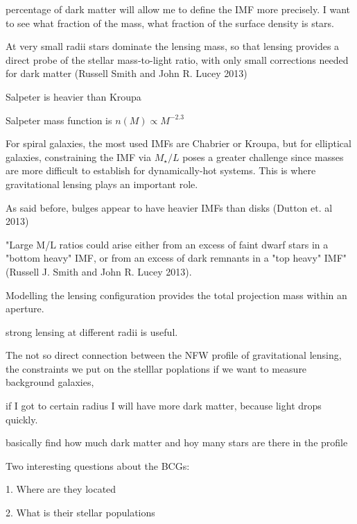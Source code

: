 percentage of dark matter will allow me to define the IMF more precisely. I want to see what fraction of the mass, what fraction of the surface density is stars. 

At very small radii stars dominate the lensing mass, so that lensing provides a direct probe of the stellar mass-to-light ratio, with only small corrections needed for dark matter (Russell Smith and John R. Lucey 2013)

Salpeter is heavier than Kroupa 

Salpeter mass function is $n(M)\propto M^{-2.3}$ 

For spiral galaxies, the most used IMFs are Chabrier or Kroupa, but for elliptical galaxies, constraining the IMF via $M_{\star}/L$ poses a greater challenge since masses are more difficult to establish for dynamically-hot systems. This is where gravitational lensing plays an important role.

As said before, bulges appear to have heavier IMFs than disks (Dutton et. al 2013)

"Large M/L ratios could arise either from an excess of faint dwarf stars in a "bottom heavy" IMF, or from an excess of dark remnants in a "top heavy" IMF" (Russell J. Smith and John R. Lucey 2013).

Modelling the lensing configuration provides the total projection mass within an aperture.

strong lensing at different radii is useful.

The not so direct connection between the NFW profile of gravitational lensing, the constraints we put on the stelllar poplations if we want to measure background galaxies, 

if I got to certain radius I will have more dark matter, because light drops quickly. 

basically find how much dark matter and hoy many stars are there in the profile

Two interesting questions about the BCGs:

1. Where are they located

2. What is their stellar populations

